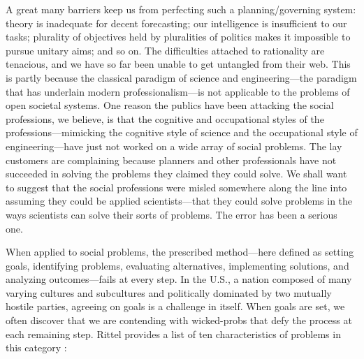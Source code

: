 \begin{displayquote}
A great many barriers keep us from perfecting such a planning/governing system: theory is inadequate for decent
forecasting; our intelligence is insufficient to our tasks; plurality of objectives held by pluralities of politics
makes it impossible to pursue unitary aims; and so on. The difficulties attached to rationality are tenacious, and we
have so far been unable to get untangled from their web. This is partly because the classical paradigm of science and
engineering---the paradigm that has underlain modern professionalism---is not applicable to the problems of open
societal systems. One reason the publics have been attacking the social professions, we believe, is that the cognitive
and occupational styles of the professions---mimicking the cognitive style of science and the occupational style of
engineering---have just not worked on a wide array of social problems. The lay customers are complaining because
planners and other professionals have not succeeded in solving the problems they claimed they could solve. We shall want
to suggest that the social professions were misled somewhere along the line into assuming they could be applied
scientists---that they could solve problems in the ways scientists can solve their sorts of problems. The error has been
a serious one. \cite{rittel_dilemmas_1973}
\end{displayquote}

When applied to social problems, the prescribed method---here defined as setting goals, identifying problems, evaluating
alternatives, implementing solutions, and analyzing outcomes---fails at every step. In the U.S., a nation composed of
many varying cultures and subcultures and politically dominated by two mutually hostile parties, agreeing on
goals is a challenge in itself. When goals are set, we often discover that we are contending with \acp{wicked-prob} that
defy the process at each remaining step. Rittel provides a list of ten characteristics of problems in this category
\cite{rittel_dilemmas_1973}:

